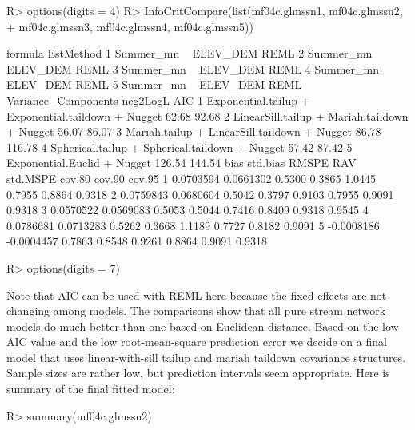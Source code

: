 \documentclass[nojss]{jss}
\renewenvironment{Schunk}{\vspace{\topsep}}{\vspace{\topsep}}
\begin{document}
\begin{Schunk}
\begin{Sinput}
R> options(digits = 4)
R> InfoCritCompare(list(mf04c.glmssn1, mf04c.glmssn2,
+     mf04c.glmssn3, mf04c.glmssn4, mf04c.glmssn5))
\end{Sinput}
\begin{Soutput}
               formula EstMethod
1 Summer_mn ~ ELEV_DEM      REML
2 Summer_mn ~ ELEV_DEM      REML
3 Summer_mn ~ ELEV_DEM      REML
4 Summer_mn ~ ELEV_DEM      REML
5 Summer_mn ~ ELEV_DEM      REML
                                 Variance_Components neg2LogL    AIC
1 Exponential.tailup + Exponential.taildown + Nugget    62.68  92.68
2       LinearSill.tailup + Mariah.taildown + Nugget    56.07  86.07
3       Mariah.tailup + LinearSill.taildown + Nugget    86.78 116.78
4     Spherical.tailup + Spherical.taildown + Nugget    57.42  87.42
5                        Exponential.Euclid + Nugget   126.54 144.54
        bias   std.bias  RMSPE    RAV std.MSPE cov.80 cov.90 cov.95
1  0.0703594  0.0661302 0.5300 0.3865   1.0445 0.7955 0.8864 0.9318
2  0.0759843  0.0680604 0.5042 0.3797   0.9103 0.7955 0.9091 0.9318
3  0.0570522  0.0569083 0.5053 0.5044   0.7416 0.8409 0.9318 0.9545
4  0.0786681  0.0713283 0.5262 0.3668   1.1189 0.7727 0.8182 0.9091
5 -0.0008186 -0.0004457 0.7863 0.8548   0.9261 0.8864 0.9091 0.9318
\end{Soutput}
\begin{Sinput}
R> options(digits = 7)
\end{Sinput}
\end{Schunk}

Note that AIC can be used with REML here because the fixed effects are
not changing among models. The comparisons show that all pure stream
network models do much better than one based on Euclidean
distance. Based on the low AIC value and the low root-mean-square
prediction error we decide on a final model that uses linear-with-sill tailup
and mariah taildown covariance structures.  Sample sizes are rather low, but
prediction intervals seem appropriate.  Here is summary of the final
fitted model:

\begin{Schunk}
\begin{Sinput}
R> summary(mf04c.glmssn2)
\end{Sinput}
\end{Schunk}
\end{document}
